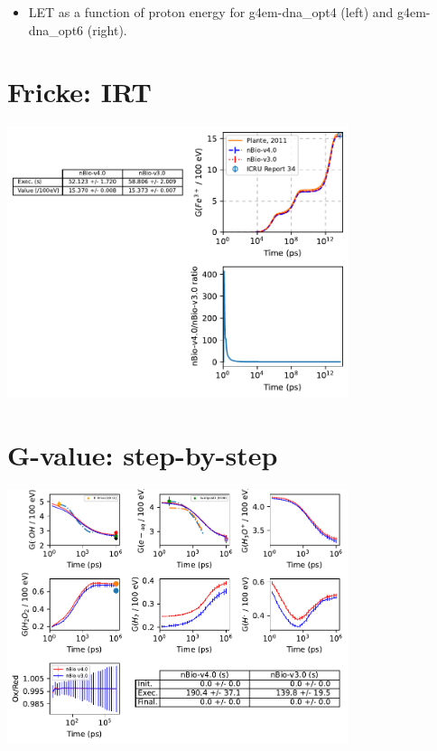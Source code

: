\documentclass[aspectratio=1610]{beamer}
\begin{document}
\begin{frame}{\secname}
\begin{columns}
\begin{column}{0.4\linewidth}
    \end{column}
   \end{columns}
\begin{itemize}
\item \tiny{LET as a function of proton energy for g4em-dna\_opt4 (left) and g4em-dna\_opt6 (right).}
\end{itemize}
\end{frame}

\section{Fricke: IRT}

\begin{frame}{\secname}
 \centering
  \includegraphics[width=0.75\textwidth]{./FrickeIRT/Gvalue}
\end{frame}

\section{G-value: step-by-step}

\begin{frame}{\secname}
 \centering
   \includegraphics[width=0.75\textwidth]{./GvalueStepByStep/Gvalue}
\end{frame}
\end{document}
